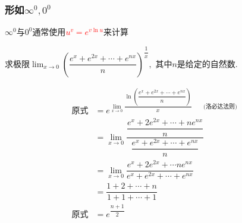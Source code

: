 \documentclass[9pt a4paper, oneside, UTF8]{ctexbook}
\begin{document}
\begin{sloppypar}
    \subsubsection{形如$\infty^0,0^0$}
          $\infty ^0$与$0^0$通常使用\textcolor{red}
              {$ u^v=e^{v \ln u}$}来计算

              \begin{problem}
              求极限$\lim_{x\to0}\left(\dfrac{e^x+e^{2x}+\cdots+e^{nx}}n\right)^{\dfrac{1}{x}},$ 其中$n$是给定的自然数.
              \end{problem}
              \begin{solution}
                  \begin{align*}
                      \text{原式} & = e^{\lim_{x \to 0} \dfrac{\ln \left(\dfrac{e^x+e^{2x}+\cdots+e^{nx}}n\right)}{x}\qquad \text{(洛必达法则)} } \\
                                & =\lim_{x\to0}\dfrac{\dfrac{e^{x}+2e^{2x}+\cdots+ne^{nx}}{n}}{\dfrac{e^{x}+e^{2x}+\cdots+e^{nx}}{n}}       \\
                                & = \lim_{x\to0}\dfrac{e^{x}+2e^{2x}+\cdots ne^{nx}}{e^{x}+e^{2x}+\cdots+e^{nx}}                          \\
                                & =\dfrac{1+2+\cdots+n}{1+1+\cdots+1}                                                                     \\
                      \text{原式} & = e^{\dfrac{n+1}{2}}
                  \end{align*}
              \end{solution}

\end{sloppypar}
\end{document}
